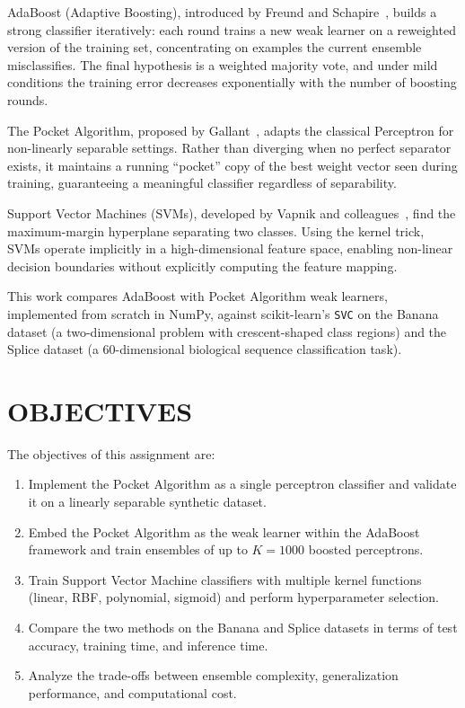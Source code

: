\documentclass{acm_proc_article-sp}
\begin{document}
AdaBoost (Adaptive Boosting), introduced by Freund and Schapire~\cite{freund1997}, builds a strong classifier iteratively: each round trains a new weak learner on a reweighted version of the training set, concentrating on examples the current ensemble misclassifies. The final hypothesis is a weighted majority vote, and under mild conditions the training error decreases exponentially with the number of boosting rounds.

The Pocket Algorithm, proposed by Gallant~\cite{gallant1990}, adapts the classical Perceptron for non-linearly separable settings. Rather than diverging when no perfect separator exists, it maintains a running ``pocket'' copy of the best weight vector seen during training, guaranteeing a meaningful classifier regardless of separability.

Support Vector Machines (SVMs), developed by Vapnik and colleagues~\cite{cortes1995}, find the maximum-margin hyperplane separating two classes. Using the kernel trick, SVMs operate implicitly in a high-dimensional feature space, enabling non-linear decision boundaries without explicitly computing the feature mapping.

This work compares AdaBoost with Pocket Algorithm weak learners, implemented from scratch in NumPy, against scikit-learn's \texttt{SVC} on the Banana dataset (a two-dimensional problem with crescent-shaped class regions) and the Splice dataset (a 60-dimensional biological sequence classification task).

\section{OBJECTIVES}

The objectives of this assignment are:

\begin{enumerate}
\item Implement the Pocket Algorithm as a single perceptron classifier and validate it on a linearly separable synthetic dataset.
\item Embed the Pocket Algorithm as the weak learner within the AdaBoost framework and train ensembles of up to $K = 1000$ boosted perceptrons.
\item Train Support Vector Machine classifiers with multiple kernel functions (linear, RBF, polynomial, sigmoid) and perform hyperparameter selection.
\item Compare the two methods on the Banana and Splice datasets in terms of test accuracy, training time, and inference time.
\item Analyze the trade-offs between ensemble complexity, generalization performance, and computational cost.
\end{enumerate}
\end{document}
